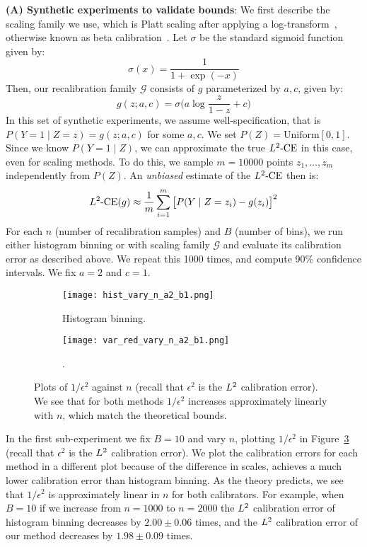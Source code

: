 \textbf{(A) Synthetic experiments to validate bounds}: We first describe the scaling family we use, which is Platt scaling after applying a log-transform~\cite{platt1999probabilistic}, otherwise known as beta calibration~\cite{kull2017sigmoids}. Let $\sigma$ be the standard sigmoid function given by:
\[ \sigma(x) = \frac{1}{1 + \exp(-x)} \]
Then, our recalibration family $\mathcal{G}$ consists of $g$ parameterized by $a, c$, given by:
\[ g(z; a, c) = \sigma\Big( a\log{\frac{z}{1-z}} + c \Big) \]
In this set of synthetic experiments, we assume well-specification, that is $P(Y = 1 \mid Z=z) = g(z; a, c)$ for some $a, c$. We set $P(Z) = \mbox{Uniform}[0, 1]$. Since we know $P(Y = 1 \mid Z)$, we can approximate the true $L^2\textup{-CE}$ in this case, even for scaling methods. To do this, we sample $m=10000$ points $z_1, \dots, z_m$ independently from $P(Z)$. An \emph{unbiased} estimate of the $L^2\textup{-CE}$ then is:
\[ L^2\textup{-CE}(g) \approx \frac{1}{m} \sum_{i=1}^m \big[P(Y \mid Z = z_i) - g(z_i)\big]^2 \]
For each $n$ (number of recalibration samples) and $B$ (number of bins), we run either histogram binning or \ourcal{} with scaling family $\mathcal{G}$ and evaluate its calibration error as described above. We repeat this 1000 times, and compute 90\% confidence intervals. We fix $a = 2$ and $c = 1$.

\begin{figure}
  \centering
  \centering
     \begin{subfigure}[b]{0.48\textwidth}
         \centering
         \texttt{[image: hist\_vary\_n\_a2\_b1.png]}
         \caption{Histogram binning.
         }
         \label{fig:well-spec-vary-n-hist}
     \end{subfigure}
     \hfill
     \begin{subfigure}[b]{0.48\textwidth}
         \centering
         \texttt{[image: var\_red\_vary\_n\_a2\_b1.png]}
         \caption{\Ourcal{}.
         }
         \label{fig:well-spec-vary-n-var-red}
     \end{subfigure}
  \caption{
    Plots of $1/\epsilon^2$ against $n$ (recall that $\epsilon^2$ is the $L^2$ calibration error). We see that for both methods $1/\epsilon^2$ increases approximately linearly with $n$, which match the theoretical bounds.
}
  \label{fig:well-spec-vary-n}
\end{figure}

In the first sub-experiment we fix $B = 10$ and vary $n$, plotting $1/\epsilon^2$ in Figure~\ref{fig:well-spec-vary-n} (recall that $\epsilon^2$ is the $L^2$ calibration error). We plot the calibration errors for each method in a different plot because of the difference in scales, \ourcal{} achieves a much lower calibration error than histogram binning. As the theory predicts, we see that $1/\epsilon^2$ is approximately linear in $n$ for both calibrators. For example, when $B=10$ if we increase from $n=1000$ to $n=2000$ the $L^2$ calibration error of histogram binning decreases by $2.00 \pm 0.06$ times, and the $L^2$ calibration error of our method decreases by $1.98 \pm 0.09$ times.


